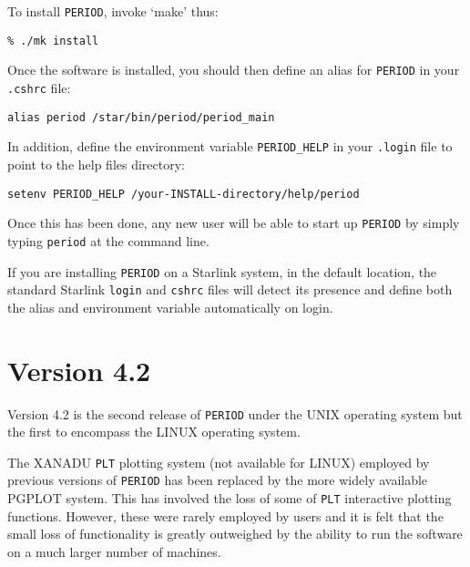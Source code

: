 To install {\tt PERIOD}, invoke `make' thus:

\begin{myquote}
\begin{verbatim}
% ./mk install
\end{verbatim}
\end{myquote}

Once the software is installed, you should then define an alias for 
{\tt PERIOD} in your {\tt .cshrc} file:

\begin{myquote}
\begin{verbatim}
alias period /star/bin/period/period_main
\end{verbatim}
\end{myquote}

In addition, define the environment variable {\tt PERIOD\_HELP} in your
{\tt .login} file to point to the help files directory:

\begin{myquote}
\begin{verbatim}
setenv PERIOD_HELP /your-INSTALL-directory/help/period
\end{verbatim}
\end{myquote}

Once this has been done, any new user will be able to start up {\tt PERIOD}
by simply typing {\tt period} at the command line.

If you are installing {\tt PERIOD} on a Starlink system, in the default
location, the standard Starlink {\tt login} and {\tt cshrc} files will
detect its presence and define both the alias and environment variable
automatically on login.

\section{Version 4.2}
 
Version 4.2 is the second release of {\tt PERIOD} under the UNIX operating
system but the first to encompass the LINUX operating system.
 
The XANADU {\tt PLT} plotting system (not available for LINUX) employed by 
previous versions of {\tt PERIOD} has been replaced by the more widely 
available PGPLOT system. This has involved the loss of some of {\tt PLT}
interactive plotting functions. However, these were rarely employed by users
and it is felt that the small loss of functionality is greatly outweighed by
the ability to run the software on a much larger number of machines.
 
